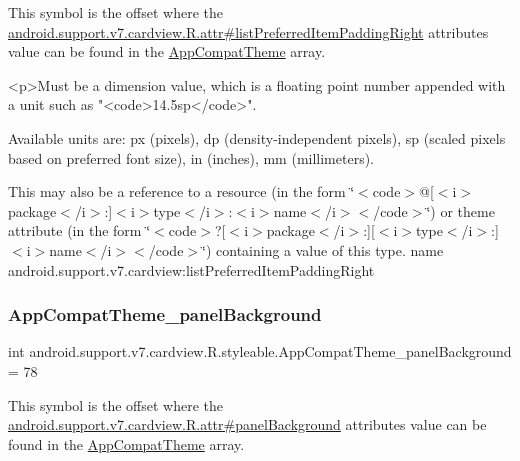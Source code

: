 This symbol is the offset where the \hyperlink{classandroid_1_1support_1_1v7_1_1cardview_1_1R_1_1attr_ad167e5c7c6361cf67c9055d74ade04c3}{android.\+support.\+v7.\+cardview.\+R.\+attr\#list\+Preferred\+Item\+Padding\+Right} attribute\textquotesingle{}s value can be found in the \hyperlink{classandroid_1_1support_1_1v7_1_1cardview_1_1R_1_1styleable_a52e6f69f954ecc2622d72c0b4d298938}{App\+Compat\+Theme} array.

\begin{DoxyVerb}      <p>Must be a dimension value, which is a floating point number appended with a unit such as "<code>14.5sp</code>".
\end{DoxyVerb}
 Available units are\+: px (pixels), dp (density-\/independent pixels), sp (scaled pixels based on preferred font size), in (inches), mm (millimeters). 

This may also be a reference to a resource (in the form \char`\"{}$<$code$>$@\mbox{[}$<$i$>$package$<$/i$>$\+:\mbox{]}$<$i$>$type$<$/i$>$\+:$<$i$>$name$<$/i$>$$<$/code$>$\char`\"{}) or theme attribute (in the form \char`\"{}$<$code$>$?\mbox{[}$<$i$>$package$<$/i$>$\+:\mbox{]}\mbox{[}$<$i$>$type$<$/i$>$\+:\mbox{]}$<$i$>$name$<$/i$>$$<$/code$>$\char`\"{}) containing a value of this type.  name android.\+support.\+v7.\+cardview\+:list\+Preferred\+Item\+Padding\+Right \mbox{\label{classandroid_1_1support_1_1v7_1_1cardview_1_1R_1_1styleable_a094e72d54827cbb597f966b9f78f4ef2}} 
\subsubsection{\texorpdfstring{App\+Compat\+Theme\+\_\+panel\+Background}{AppCompatTheme\_panelBackground}}
{\footnotesize\ttfamily int android.\+support.\+v7.\+cardview.\+R.\+styleable.\+App\+Compat\+Theme\+\_\+panel\+Background = 78\hspace{0.3cm}{\ttfamily [static]}}

This symbol is the offset where the \hyperlink{classandroid_1_1support_1_1v7_1_1cardview_1_1R_1_1attr_ae0382b2cfe69d6efa8813fb44fb5f1f6}{android.\+support.\+v7.\+cardview.\+R.\+attr\#panel\+Background} attribute\textquotesingle{}s value can be found in the \hyperlink{classandroid_1_1support_1_1v7_1_1cardview_1_1R_1_1styleable_a52e6f69f954ecc2622d72c0b4d298938}{App\+Compat\+Theme} array.

